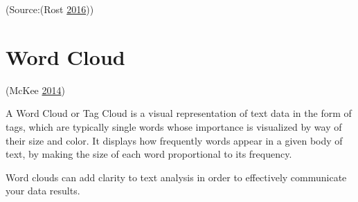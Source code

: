 \documentclass[]{book}
\begin{document}
(Source:(Rost \protect\hyperlink{ref-different_tools}{2016}))

\section{Word Cloud}\label{word-cloud}

(McKee \protect\hyperlink{ref-wordcloud}{2014})

A Word Cloud or Tag Cloud is a visual representation of text data in the
form of tags, which are typically single words whose importance is
visualized by way of their size and color. It displays how frequently
words appear in a given body of text, by making the size of each word
proportional to its frequency.

Word clouds can add clarity to text analysis in order to effectively
communicate your data results.
\end{document}
